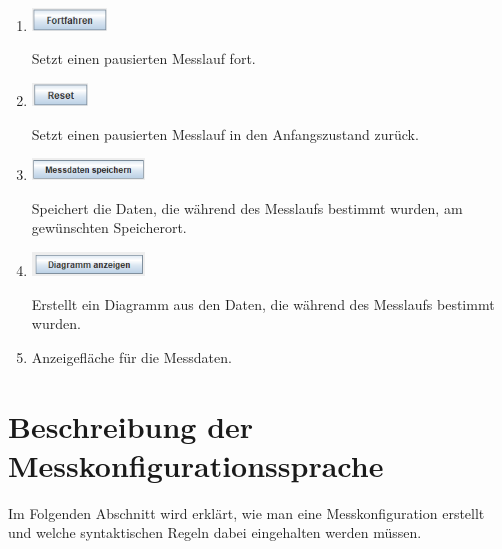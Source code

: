 \documentclass[parskip=full]{scrartcl}
\begin{document}
\begin{enumerate}
    \item
    \begin{flushleft}
        \includegraphics[width = 2cm]{Grafiken/10-Fortfahren.png}
    \end{flushleft}
    Setzt einen pausierten Messlauf fort.
    
    \item
    \begin{flushleft}
        \includegraphics[width = 1.5cm]{Grafiken/11-Reset.png}
    \end{flushleft}
    Setzt einen pausierten Messlauf in den Anfangszustand zurück.
    
    \item
    \begin{flushleft}
        \includegraphics[width = 3cm]{Grafiken/12-Messdaten_speichern.png}
    \end{flushleft}
    Speichert die Daten, die während des Messlaufs bestimmt wurden, am gewünschten Speicherort.
    
    \item
    \begin{flushleft}
        \includegraphics[width = 3cm]{Grafiken/13-Diagramm_anzeigen.png}
    \end{flushleft}
    Erstellt ein Diagramm aus den Daten, die während des Messlaufs bestimmt wurden.
    
    \item Anzeigefläche für die Messdaten.
    
\end{enumerate}

\clearpage

\section{Beschreibung der Messkonfigurationssprache}


Im Folgenden Abschnitt wird erklärt, wie man eine Messkonfiguration erstellt und welche syntaktischen Regeln dabei eingehalten werden müssen.  
\end{document}
